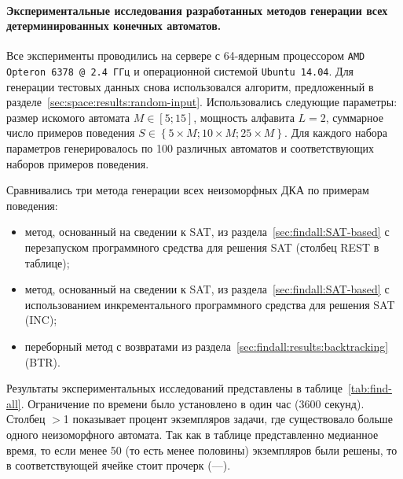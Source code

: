 
\paragraph*{Экспериментальные исследования разработанных методов генерации всех детерминированных конечных автоматов.}
\label{sec:findall:results:dfs}

Все эксперименты проводились на сервере с 64-ядерным процессором \texttt{AMD Opteron 6378 @ 2.4 ГГц} и операционной системой \texttt{Ubuntu 14.04}.
Для генерации тестовых данных снова использовался алгоритм, предложенный в разделе~\ref{sec:space:results:random-input}.
Использовались следующие параметры: размер искомого автомата $M \in \left[5; 15\right]$, мощность алфавита $L = 2$, суммарное число примеров поведения $S \in \left\{5 \times M; 10 \times M; 25 \times M\right\}$.
Для каждого набора параметров генерировалось по 100 различных автоматов и соответствующих наборов примеров поведения.

Сравнивались три метода генерации всех неизоморфных ДКА по примерам поведения:
\begin{itemize}
  \item метод, основанный на сведении к SAT, из раздела~\ref{sec:findall:SAT-based} с перезапуском программного средства для решения SAT (столбец REST в таблице);
  \item метод, основанный на сведении к SAT, из раздела~\ref{sec:findall:SAT-based} с использованием инкрементального программного средства для решения SAT (INC);
  \item переборный метод с возвратами из раздела~\ref{sec:findall:results:backtracking} (BTR).
\end{itemize}
Результаты экспериментальных исследований представлены в таблице~\ref{tab:find-all}.
Ограничение по времени было установлено в один час (3600 секунд).
Столбец $>$1 показывает процент экземпляров задачи, где существовало больше одного неизоморфного автомата.
Так как в таблице представленно медианное время, то если менее 50 (то есть менее половины) экземпляров были решены, то в соответствующей ячейке стоит прочерк (---).

